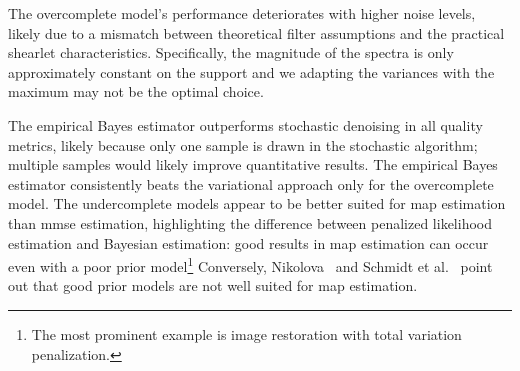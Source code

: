The overcomplete model's performance deteriorates with higher noise levels, likely due to a mismatch between theoretical filter assumptions and the practical shearlet characteristics.
Specifically, the magnitude of the spectra is only approximately constant on the support and we adapting the variances with the maximum may not be the optimal choice.

The empirical Bayes estimator outperforms stochastic denoising in all quality metrics, likely because only one sample is drawn in the stochastic algorithm;
multiple samples would likely improve quantitative results.
The empirical Bayes estimator consistently beats the variational approach only for the overcomplete model.
The undercomplete models appear to be better suited for \gls{map} estimation than \gls{mmse} estimation, highlighting the difference between penalized likelihood estimation and Bayesian estimation:
good results in \gls{map} estimation can occur even with a poor prior model\footnote{%
	The most prominent example is image restoration with total variation penalization.
}
Conversely, Nikolova~\cite{nikolova2007model} and Schmidt et al.~\cite[section 5]{schmidt_generative_2010} point out that good prior models are not well suited for \gls{map} estimation.

